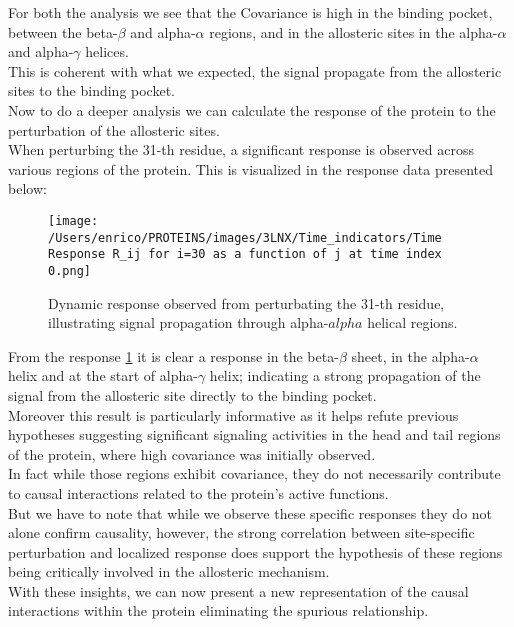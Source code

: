 \documentclass[English, Lau, oneside]{sapthesis}
\begin{document}
For both the analysis we see that the Covariance is high in the binding pocket, between the beta-$\beta$ and alpha-$\alpha$ regions, and in the allosteric sites in the alpha-$\alpha$ and alpha-$\gamma$ helices.\\
This is coherent with what we expected, the signal propagate from the allosteric sites to the binding pocket.\\







Now to do a deeper analysis we can calculate the response of the protein to the perturbation of the allosteric sites.\\
When perturbing the 31-th residue, a significant response is observed across various regions of the protein. 
This is visualized in the response data presented below:
\begin{figure}[h!]
    \centering
    \texttt{[image: /Users/enrico/PROTEINS/images/3LNX/Time\_indicators/Time Response R\_ij for i=30 as a function of j at time index 0.png]}
    \caption{Dynamic response observed from perturbating the 31-th residue, illustrating signal propagation through alpha-$alpha$ helical regions.}
    \label{fig:resp31}
\end{figure}
\newpage
From the response \ref{fig:resp31} it is clear a response in the beta-$\beta$ sheet, in the alpha-$\alpha$ helix and at the start of alpha-$\gamma$ helix; indicating a strong propagation of the signal from the allosteric site directly to the binding pocket. \\
Moreover this result is particularly informative as it helps refute previous hypotheses suggesting significant signaling activities in the head and tail regions of the protein, where high covariance was initially observed. \\
In fact while those regions exhibit covariance, they do not necessarily contribute to causal interactions related to the protein's active functions. \\
But we have to note that while we observe these specific responses they do not alone confirm causality, however, the strong correlation between site-specific perturbation and localized response does support the hypothesis of these regions being critically involved in the allosteric mechanism.\\
With these insights, we can now present a new representation of the causal interactions within the protein eliminating the spurious relationship.\\
\end{document}
